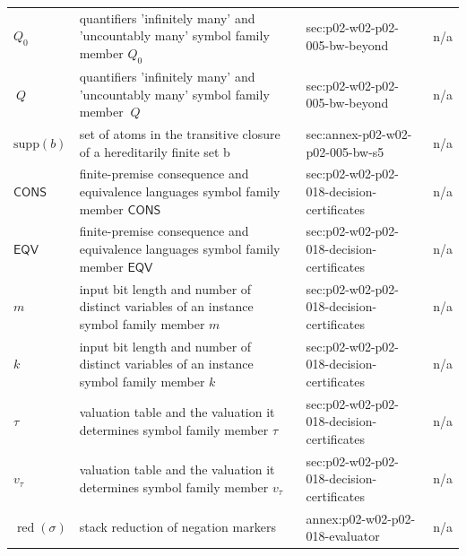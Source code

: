 \begin{longtable}{@{}p{}p{}p{}p{}@{}}
\(Q_0\) & quantifiers 'infinitely many' and 'uncountably many' symbol family member \(Q_0\) & sec:\allowbreak{}p02-\allowbreak{}w02-\allowbreak{}p02-\allowbreak{}005-\allowbreak{}bw-\allowbreak{}beyond & n/a \\
\(\ Q\) & quantifiers 'infinitely many' and 'uncountably many' symbol family member \(\ Q\) & sec:\allowbreak{}p02-\allowbreak{}w02-\allowbreak{}p02-\allowbreak{}005-\allowbreak{}bw-\allowbreak{}beyond & n/a \\
\(\mathrm{supp}(b)\) & set of atoms in the transitive closure of a hereditarily finite set b & sec:\allowbreak{}annex-\allowbreak{}p02-\allowbreak{}w02-\allowbreak{}p02-\allowbreak{}005-\allowbreak{}bw-\allowbreak{}s5 & n/a \\
\(\mathsf{CONS}\) & finite-premise consequence and equivalence languages symbol family member \(\mathsf{CONS}\) & sec:\allowbreak{}p02-\allowbreak{}w02-\allowbreak{}p02-\allowbreak{}018-\allowbreak{}decision-\allowbreak{}certificates & n/a \\
\(\mathsf{EQV}\) & finite-premise consequence and equivalence languages symbol family member \(\mathsf{EQV}\) & sec:\allowbreak{}p02-\allowbreak{}w02-\allowbreak{}p02-\allowbreak{}018-\allowbreak{}decision-\allowbreak{}certificates & n/a \\
\(m\) & input bit length and number of distinct variables of an instance symbol family member \(m\) & sec:\allowbreak{}p02-\allowbreak{}w02-\allowbreak{}p02-\allowbreak{}018-\allowbreak{}decision-\allowbreak{}certificates & n/a \\
\(k\) & input bit length and number of distinct variables of an instance symbol family member \(k\) & sec:\allowbreak{}p02-\allowbreak{}w02-\allowbreak{}p02-\allowbreak{}018-\allowbreak{}decision-\allowbreak{}certificates & n/a \\
\(\tau\) & valuation table and the valuation it determines symbol family member \(\tau\) & sec:\allowbreak{}p02-\allowbreak{}w02-\allowbreak{}p02-\allowbreak{}018-\allowbreak{}decision-\allowbreak{}certificates & n/a \\
\(v_\tau\) & valuation table and the valuation it determines symbol family member \(v_\tau\) & sec:\allowbreak{}p02-\allowbreak{}w02-\allowbreak{}p02-\allowbreak{}018-\allowbreak{}decision-\allowbreak{}certificates & n/a \\
\(\operatorname{red}(\sigma)\) & stack reduction of negation markers & annex:\allowbreak{}p02-\allowbreak{}w02-\allowbreak{}p02-\allowbreak{}018-\allowbreak{}evaluator & n/a \\

\end{longtable}
